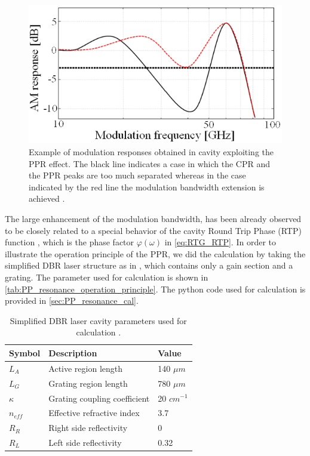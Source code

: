 \begin{figure}[ht]
    \centering
    \includegraphics[width=.6\linewidth]{figures/PP_resonance_in_modulation_response.png}
    \caption{Example of modulation responses obtained in cavity exploiting the PPR effect. The black line indicates a case in which the CPR and the PPR peaks are too much separated whereas in the case indicated by the red line the modulation bandwidth extension is achieved \cite{montrosset2014laser}.}
    \label{fig:PP_resonance_in_modulation_response}
\end{figure}

The large enhancement of the modulation bandwidth, has been already observed to be closely related to a special behavior of the cavity Round Trip Phase (RTP) function \cite{reithmaier2005modulation}, which is the phase factor $\varphi(\omega)$ in \autoref{eq:RTG_RTP}. In order to illustrate the operation principle of the PPR, we did the calculation by taking the simplified DBR laser structure as in \cite{montrosset2014laser}, which contains only a gain section and a grating. The parameter used for calculation is shown in \autoref{tab:PP_resonance_operation_principle}. The python code used for calculation is provided in \autoref{sec:PP_resonance_cal}.

\begin{table}[ht]
    \centering
    \caption{Simplified DBR laser cavity parameters used for calculation \cite{montrosset2014laser}.}
    \label{tab:PP_resonance_operation_principle}
    \begin{tabular}{@{}lll@{}}
    \toprule
    Symbol    & Description                  & Value        \\ \midrule
    $L_A$     & Active region length         & 140 $\mu m$  \\
    $L_G$     & Grating region length        & 780 $\mu m$  \\
    $\kappa$  & Grating coupling coefficient & 20 $cm^{-1}$ \\
    $n_{eff}$ & Effective refractive index   & 3.7          \\
    $R_R$     & Right side reflectivity      & 0            \\
    $R_L$     & Left side reflectivity       & 0.32         \\ \bottomrule
    \end{tabular}
\end{table}

